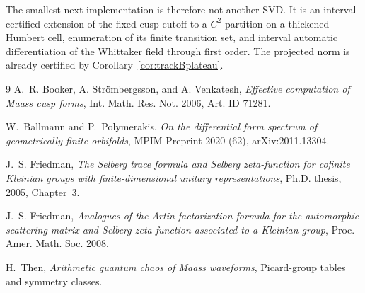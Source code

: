 \documentclass[11pt]{amsart}
\theoremstyle{definition}
\begin{document}
The smallest next implementation is therefore not another SVD. It is an
interval-certified extension of the fixed cusp cutoff to a $C^2$ partition
on a thickened Humbert cell, enumeration of its finite transition set, and
interval automatic differentiation of the Whittaker field through first
order. The projected norm is already certified by
Corollary~\ref{cor:trackBplateau}.

\begin{thebibliography}{9}
A.~R. Booker, A. Str\"ombergsson, and A. Venkatesh,
\emph{Effective computation of Maass cusp forms},
Int. Math. Res. Not. 2006, Art. ID 71281.

W.~Ballmann and P.~Polymerakis,
\emph{On the differential form spectrum of geometrically finite orbifolds},
MPIM Preprint 2020 (62), arXiv:2011.13304.

J.~S. Friedman,
\emph{The Selberg trace formula and Selberg zeta-function for cofinite
Kleinian groups with finite-dimensional unitary representations},
Ph.D. thesis, 2005, Chapter~3.

J.~S. Friedman,
\emph{Analogues of the Artin factorization formula for the automorphic
scattering matrix and Selberg zeta-function associated to a Kleinian group},
Proc. Amer. Math. Soc. 2008.

H.~Then, \emph{Arithmetic quantum chaos of Maass waveforms}, Picard-group
tables and symmetry classes.
\end{thebibliography}
\end{document}
